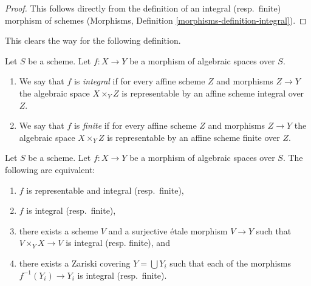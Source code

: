 \begin{proof}
This follows directly from the definition of an integral (resp.\ finite)
morphism of schemes
(Morphisms, Definition \ref{morphisms-definition-integral}).
\end{proof}

\noindent
This clears the way for the following definition.

\begin{definition}
\label{definition-integral}
Let $S$ be a scheme.
Let $f : X \to Y$ be a morphism of algebraic spaces over $S$.
\begin{enumerate}
\item We say that $f$ is {\it integral} if for every affine scheme $Z$
and morphisms $Z \to Y$ the algebraic space $X \times_Y Z$ is
representable by an affine scheme integral over $Z$.
\item We say that $f$ is {\it finite} if for every affine scheme $Z$
and morphisms $Z \to Y$ the algebraic space $X \times_Y Z$ is
representable by an affine scheme finite over $Z$.
\end{enumerate}
\end{definition}

\begin{lemma}
\label{lemma-integral-local}
Let $S$ be a scheme.
Let $f : X \to Y$ be a morphism of algebraic spaces over $S$.
The following are equivalent:
\begin{enumerate}
\item $f$ is representable and integral (resp.\ finite),
\item $f$ is integral (resp.\ finite),
\item there exists a scheme $V$ and a surjective \'etale morphism
$V \to Y$ such that $V \times_Y X \to V$ is integral (resp. finite), and
\item there exists a Zariski covering $Y = \bigcup Y_i$ such that
each of the morphisms $f^{-1}(Y_i) \to Y_i$ is integral (resp.\ finite).
\end{enumerate}
\end{lemma}

